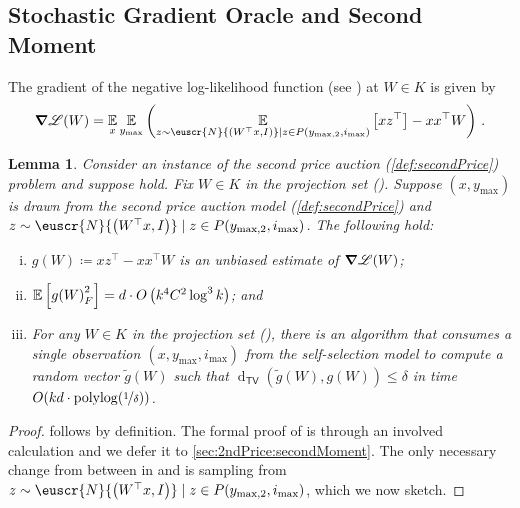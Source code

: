 \documentclass[11pt,letterpaper]{article}
\theoremstyle{plain}
\newtheorem{lemma}[theorem]{Lemma}
\theoremstyle{definition}
\theoremstyle{remark}
\newcommand{\inparen}[1]{\ensuremath{\left(#1\right)}}
\newcommand{\insquare}[1]{\ensuremath{\left[#1\right]}}
\let\norm\relax
\newcommand{\norm}[1]{\ensuremath{\left\lVert #1 \right\rVert}}
\newcommand{\E}{\operatornamewithlimits{\mathbb{E}}}
\newcommand{\Ex}{\E}
\newcommand{\tv}[2]{\operatorname{d}_{\mathsf{TV}}{\inparen{#1,#2}}}
\newcommand{\nfrac}[2]{\nicefrac{#1}{#2}}
\newcommand{\polylog}{\mathrm{polylog}}
\renewcommand{\tilde}{\widetilde}
\newcommand{\customcal}[1]{\euscr{#1}}
\newcommand{\cL}{\customcal{L}}
\newcommand{\cN}{\customcal{N}}
\newcommand{\negLL}{\ensuremath{\mathscr{L}}}
\newcommand{\normal}[2]{\cN{\inparen{#1,#2}}}
\newcommand{\ymax}{y_{\max}}
\renewcommand{\cL}{\negLL}
\newcommand{\smax}{\max,2} %
\newcommand{\imax}{i_{\max}}
\newcommand{\ysmax}{y_{\smax}}
\begin{document}
{{\subsection{Stochastic Gradient Oracle and Second Moment}
    The gradient of the negative log-likelihood function (see ) at $W\in K$ is given by
    \begin{align*}
        \grad \cL(W)
            = \Ex_x \Ex_{\ymax}
                \inparen{
                    \Ex_{z\sim \normal{W^\top x}{I} \mid z\in P(\ysmax,\imax)}\insquare{xz^\top }
                    - 
                    xx^\top W
                }
            \,.
    \end{align*}
    
    \begin{lemma}\label{lem:2ndPrice:gradientOracle}
        Consider an instance of the {second price auction} (\cref{def:secondPrice}) problem
        and suppose  hold.
        Fix $W\in K$ in the projection set ().
        Suppose $(x, \ymax)$ is drawn from the {second price auction} model (\cref{def:secondPrice}) 
        and $z\sim \normal{W^\top x}{I}\mid z\in P(\ysmax, \imax)$.
        The following hold:
        \begin{enumerate}[(i)]
            \item $g(W)\coloneqq xz^\top - xx^\top W$ is an unbiased estimate of $\grad \negLL(W)$; \label{part:2ndPrice:gradientOracle:unbiased}
            \item $\E\insquare{\norm{g(W)}_F^2} = d\cdot O\inparen{k^4C^2  \log^3{k}}$; and  \label{part:2ndPrice:gradientOracle:secondMoment}  
            \item For any $W\in K$ in the projection set (),
            there is an algorithm that consumes a single observation $(x, \ymax, \imax)$ 
            from the self-selection model
            to compute a random vector $\tilde g(W)$ such that $\tv{\tilde g(W)}{g(W)}\leq \delta$
            in time $O(kd\cdot \polylog(\nfrac1{\delta}))$. \label{part:2ndPrice:gradientOracle:algorithm}
        \end{enumerate}
    \end{lemma}

    \begin{proof}
        \sloppy
         follows by definition.
        The formal proof of  is through an involved calculation
        and we defer it to \cref{sec:2ndPrice:secondMoment}.
        The only necessary change from between  in  and  is sampling from $z\sim \normal{W^\top x}{I}\mid z\in P(\ysmax, \imax)$,
        which we now sketch.


\end{proof}}}
\end{document}
